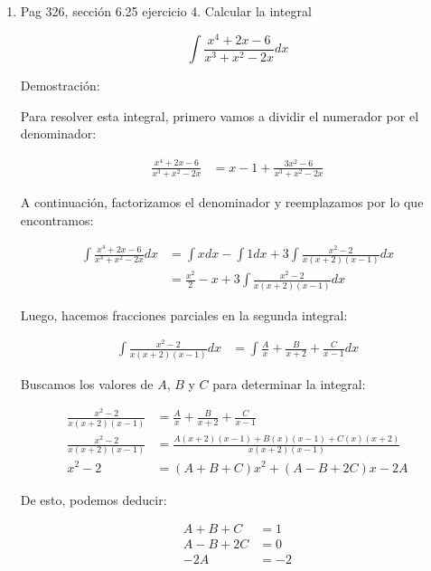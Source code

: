 \documentclass{report}
\begin{document}
\begin{enumerate}
        \item Pag 326, sección 6.25 ejercicio 4. Calcular la integral
        
        $$\int \frac{x^{4}+2 x-6}{x^{3}+x^{2}-2 x} d x$$
        
        Demostración:
        
        Para resolver esta integral, primero vamos a dividir el numerador por el denominador:
        
        \begin{align*}
        \frac{x^4+2x-6}{x^3+x^2-2x} &= x-1+\frac{3x^2-6}{x^3+x^2-2x}
        \end{align*}
        
        A continuación, factorizamos el denominador y reemplazamos por lo que encontramos:
        
        \begin{align*}
        \int{\frac{x^4+2x-6}{x^3+x^2-2x}dx} &= \int x dx-\int 1 dx+3\int{\frac{x^2-2}{x(x+2)(x-1)}dx} \\
        &= \frac{x^2}{2}-x+3\int{\frac{x^2-2}{x(x+2)(x-1)}dx}
        \end{align*}
        
        Luego, hacemos fracciones parciales en la segunda integral:
        
        \begin{align*}
        \int{\frac{x^2-2}{x(x+2)(x-1)}dx} &= \int{\frac{A}{x}+\frac{B}{x+2}+\frac{C}{x-1}dx}
        \end{align*}
        
        Buscamos los valores de $A$, $B$ y $C$ para determinar la integral:
        
        \begin{align*}
        \frac{x^2-2}{x(x+2)(x-1)} &= \frac{A}{x}+\frac{B}{x+2}+\frac{C}{x-1} \\
        \frac{x^2-2}{x(x+2)(x-1)} &= \frac{A(x+2)(x-1)+B(x)(x-1)+C(x)(x+2)}{x(x+2)(x-1)} \\
        x^2-2 &= (A+B+C)x^2+(A-B+2C)x-2A
        \end{align*}
        
        De esto, podemos deducir:
        
        \begin{align*}
        A+B+C &= 1 \\
        A-B+2C &= 0 \\
        -2A &= -2
        \end{align*}
        

\end{enumerate}
\end{document}
